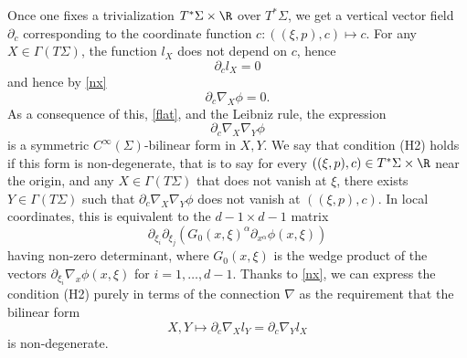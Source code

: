 \documentclass{article}
\numberwithin{equation}{section}
\theoremstyle{plain}
\begin{document}
Once one fixes a trivialization $T^*\Sigma \times \R$ over $T^* \Sigma$, we get a vertical vector field $\partial_c$ corresponding to the coordinate function $c: ((\xi,p),c) \mapsto c$.  For any $X \in \Gamma(T\Sigma)$, the function $l_X$ does not depend on $c$, hence
$$ \partial_c l_X = 0$$
and hence by \eqref{nx}
$$ \partial_c \nabla_X \phi = 0.$$
As a consequence of this, \eqref{flat}, and the Leibniz rule, the expression
$$\partial_c \nabla_X \nabla_Y \phi$$
is a symmetric $C^\infty(\Sigma)$-bilinear form in $X,Y$.  We say that condition (H2) holds if this form is non-degenerate, that is to say for every $((\xi,p),c) \in T^*\Sigma \times \R$ near the origin, and any $X \in \Gamma(T\Sigma)$ that does not vanish at $\xi$, there exists $Y \in \Gamma(T\Sigma)$ such that $\partial_c \nabla_X \nabla_Y \phi$ does not vanish at $((\xi,p),c)$.  In local coordinates, this is equivalent to the $d-1 \times d-1$ matrix
$$\partial_{\xi_i} \partial_{\xi_j} (G_0(x,\xi)^\alpha \partial_{x^\alpha} \phi(x,\xi))$$
having non-zero determinant, where $G_0(x,\xi)$ is the wedge product of the vectors $\partial_{\xi_i}\nabla_x \phi(x,\xi)$ for $i=1,\dots,d-1$.  Thanks to \eqref{nx}, we can express the condition (H2) purely in terms of the connection $\nabla$ as the requirement that the bilinear form
$$ X, Y \mapsto \partial_c \nabla_X l_Y = \partial_c \nabla_Y l_X$$
is non-degenerate.\\
\end{document}
